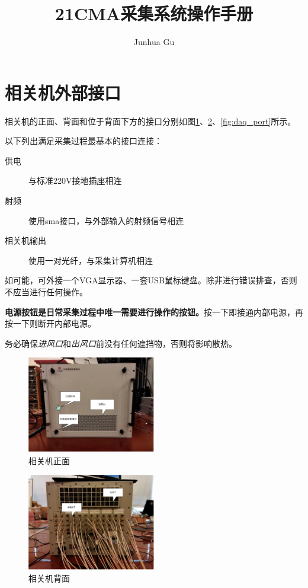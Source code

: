 \documentclass[11pt,includemp,a4paper]{article}
\title{21CMA采集系统操作手册}
\author{Junhua Gu}
\begin{document}
\maketitle
\section{相关机外部接口}
相关机的正面、背面和位于背面下方的接口分别如图\ref{fig:daq_front}、\ref{fig:daq_back}、\ref{fig:daq_port}所示。

以下列出满足采集过程最基本的接口连接：
\begin{description}
    \item[供电] 与标准220V接地插座相连
    \item[射频] 使用sma接口，与外部输入的射频信号相连
    \item[相关机输出] 使用一对光纤，与采集计算机相连
\end{description}

如可能，可外接一个VGA显示器、一套USB鼠标键盘。除非进行错误排查，否则不应当进行任何操作。

\textbf{电源按钮是日常采集过程中唯一需要进行操作的按钮。}按一下即接通内部电源，再按一下则断开内部电源。


务必确保\textit{进风口}和\textit{出风口}前没有任何遮挡物，否则将影响散热。

\begin{figure}
    \begin{center}
        \includegraphics[width=0.5\textwidth]{front.pdf}
    \end{center}
    \caption{\label{fig:daq_front}相关机正面}
\end{figure}

\begin{figure}
    \begin{center}
        \includegraphics[width=0.5\textwidth]{back.pdf}
    \end{center}
    \caption{\label{fig:daq_back}相关机背面}
\end{figure}
\end{document}
